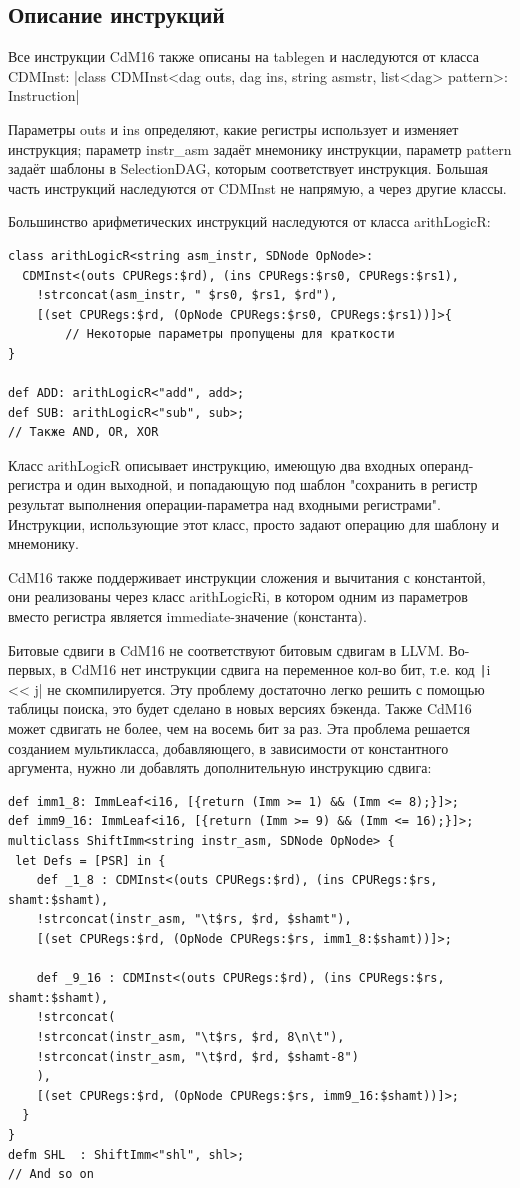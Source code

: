 \documentclass[a4paper,14pt]{extarticle}
\begin{document}
\subsection{Описание инструкций}
Все инструкции CdM16 также описаны на tablegen и наследуются от класса CDMInst:
|class CDMInst<dag outs, dag ins, string asmstr, list<dag> pattern>: Instruction|

Параметры outs и ins определяют, какие регистры использует и изменяет инструкция; параметр instr\_asm задаёт мнемонику инструкции, параметр pattern задаёт шаблоны в SelectionDAG, которым соответствует инструкция. Большая часть инструкций наследуются от CDMInst не напрямую, а через другие классы.

Большинство арифметических инструкций наследуются от класса arithLogicR:
\begin{verbatim}
class arithLogicR<string asm_instr, SDNode OpNode>:
  CDMInst<(outs CPURegs:$rd), (ins CPURegs:$rs0, CPURegs:$rs1),
    !strconcat(asm_instr, " $rs0, $rs1, $rd"),
    [(set CPURegs:$rd, (OpNode CPURegs:$rs0, CPURegs:$rs1))]>{
		// Некоторые параметры пропущены для краткости
}

def ADD: arithLogicR<"add", add>;
def SUB: arithLogicR<"sub", sub>;
// Также AND, OR, XOR
\end{verbatim}

Класс arithLogicR описывает инструкцию, имеющую два входных операнд-регистра и один выходной, и попадающую под шаблон "сохранить в регистр результат выполнения операции-параметра над входными регистрами". Инструкции, использующие этот класс, просто задают операцию для шаблону и мнемонику.

CdM16 также поддерживает инструкции сложения и вычитания с константой, они реализованы через класс arithLogicRi, в котором одним из параметров вместо регистра является immediate-значение (константа).

Битовые сдвиги в CdM16 не соответствуют битовым сдвигам в LLVM. Во-первых, в CdM16 нет инструкции сдвига на переменное кол-во бит, т.е. код \texttt|i << j| не скомпилируется. Эту проблему достаточно легко решить с помощью таблицы поиска, это будет сделано в новых версиях бэкенда. Также CdM16 может сдвигать не более, чем на восемь бит за раз. Эта проблема решается созданием мультикласса, добавляющего, в зависимости от константного аргумента, нужно ли добавлять дополнительную инструкцию сдвига:
\begin{verbatim}
def imm1_8: ImmLeaf<i16, [{return (Imm >= 1) && (Imm <= 8);}]>;
def imm9_16: ImmLeaf<i16, [{return (Imm >= 9) && (Imm <= 16);}]>;
multiclass ShiftImm<string instr_asm, SDNode OpNode> {
 let Defs = [PSR] in {
	def _1_8 : CDMInst<(outs CPURegs:$rd), (ins CPURegs:$rs, shamt:$shamt),
	!strconcat(instr_asm, "\t$rs, $rd, $shamt"),
	[(set CPURegs:$rd, (OpNode CPURegs:$rs, imm1_8:$shamt))]>;
	
	def _9_16 : CDMInst<(outs CPURegs:$rd), (ins CPURegs:$rs, shamt:$shamt),
	!strconcat(
	!strconcat(instr_asm, "\t$rs, $rd, 8\n\t"),
	!strconcat(instr_asm, "\t$rd, $rd, $shamt-8")
	),
	[(set CPURegs:$rd, (OpNode CPURegs:$rs, imm9_16:$shamt))]>;
  }
}
defm SHL  : ShiftImm<"shl", shl>;
// And so on
\end{verbatim}
\end{document}
